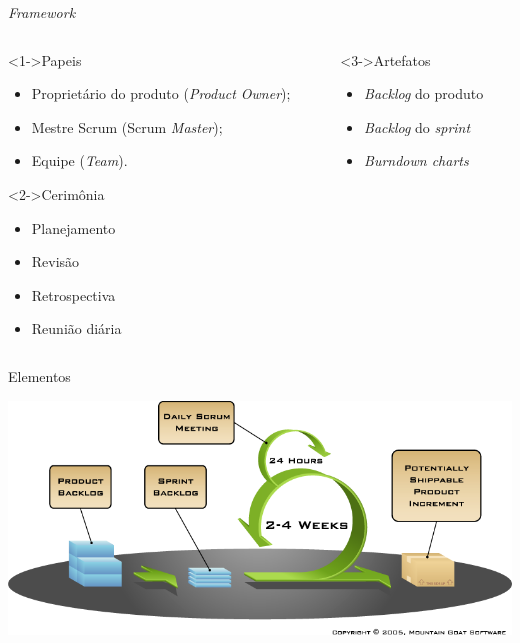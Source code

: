 \begin{frame}{{\em Framework} \insertlecture}\small
\begin{columns}
\begin{column}{.5\textwidth}
  \begin{block}<1->{Papeis}\scriptsize
    \begin{itemize}
    \item Proprietário do produto ({\em Product Owner});
    \item Mestre Scrum (Scrum {\em Master});
    \item Equipe ({\em Team}).
    \end{itemize}
  \end{block}
  \pause
  \begin{block}<2->{Cerimônia}
    \begin{itemize}
    \item Planejamento
    \item Revisão
    \item Retrospectiva
    \item Reunião diária
    \end{itemize}
  \end{block}  
\end{column}
\begin{column}{.5\textwidth}
  \begin{block}<3->{Artefatos}
    \begin{itemize}
    \item {\em Backlog} do produto
    \item {\em Backlog} do {\em sprint}
    \item {\em Burndown charts}
    \end{itemize}
  \end{block}
\end{column}
\end{columns}
\end{frame}

\begin{frame}[fragile]{\insertlecture}{Elementos}
  \begin{center}
    \includegraphics[scale=.4]{img/scrum.png}
  \end{center}
\end{frame}

